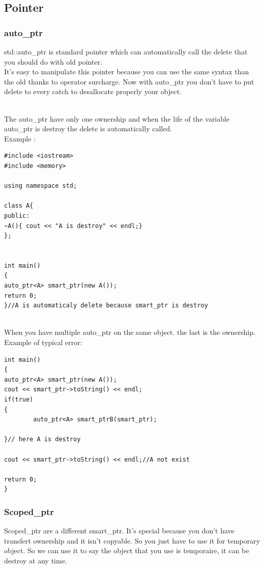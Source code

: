 \documentclass[a4paper,11pt]{report}
\begin{document}
\subsection{Pointer}
\subsubsection{auto\_ptr}
std::auto\_ptr is standard pointer which can automatically call the delete that you should do with old pointer.\\
It's easy to manipulate this pointer because you can use the same syntax than the old thanks to operator surcharge.
Now with auto\_ptr you don't have to put delete to every catch to desallocate properly your object.


\\
The auto\_ptr have only one ownership and when the life of the variable auto\_ptr is destroy the delete is automatically called.\\
Example :
\begin{verbatim}
#include <iostream>
#include <memory>

using namespace std;

class A{
public:
~A(){ cout << "A is destroy" << endl;}
};


int main()
{
auto_ptr<A> smart_ptr(new A());
return 0;
}//A is automaticaly delete because smart_ptr is destroy
\end{verbatim}




\\
When you have multiple auto\_ptr on the same object. the last is the ownership. \\
Example of typical error: \\
\begin{verbatim}
int main()
{
auto_ptr<A> smart_ptr(new A());
cout << smart_ptr->toString() << endl;
if(true)
{
        auto_ptr<A> smart_ptrB(smart_ptr);

}// here A is destroy

cout << smart_ptr->toString() << endl;//A not exist

return 0;
}
\end{verbatim}


\subsubsection{Scoped\_ptr}
Scoped\_ptr are a different smart\_ptr. It's special because you don't have transfert ownership and it isn't copyable.
So you just have to use it for temporary object.
So we can use it to say the object that you use is temporaire, it can be destroy at any time.
\end{document}

